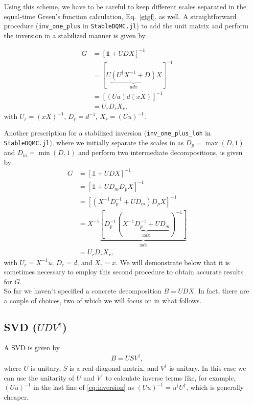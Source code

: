\documentclass[%
 reprint,
superscriptaddress,
citeautoscript,
showpacs,
 amsmath,amssymb,
 aps,
 prb,
longbibliography,
]{revtex4-1}
\begin{document}
Using this scheme, we have to be careful to keep different scales separated in the equal-time Green's function calculation, Eq.~\ref{etgf}, as well. A straightforward procedure (\texttt{inv\_one\_plus} in \texttt{StableDQMC.jl}) to add the unit matrix and perform the inversion in a stabilized manner is given by\cite{Santos2003, Assaad2002a}

\begin{align}
	G &= [\mathbb{1} + UDX]^{-1} \nonumber \\
	&= [U\underbrace{(U^\dagger X^{-1} + D)}_{udx}X]^{-1} \nonumber\\
	&= [(Uu)d(xX)]^{-1} \label{eq:inversion}\\
	&= U_r D_r X_r \nonumber,
\end{align}
with $U_r = (xX)^{-1}$, $D_r = d^{-1}$, $X_r = (Uu)^{-1}$.

Another prescription for a stabilized inversion (\texttt{inv\_one\_plus\_loh} in \texttt{StableDQMC.jl}), where we initially separate the scales in as $D_p = \max(D, 1)$ and $D_m = \min(D, 1)$ and perform two intermediate decompositions, is given by\cite{Loh2005, Loh1989}
\begin{align}
	G &= [\mathbb{1} + UDX]^{-1} \nonumber\\
	&= [\mathbb{1} + UD_mD_pX]^{-1} \nonumber\\
	&= [(X^{-1} D_p^{-1} + U D_m) D_p X]^{-1} \label{eq:inversion_loh} \\
	&= X^{-1} \underbrace{[D_p^{-1} (\underbrace{X^{-1} D_p^{-1} + UD_m}_{udx})^{-1}]}_{udx} \\
	&= U_r D_r X_r, \nonumber
\end{align}
with $U_r = X^{-1}u$, $D_r = d$, and $X_r = x$. We will demonstrate below that it is sometimes necessary to employ this second procedure to obtain accurate results for $G$.\\

So far we haven't specified a concrete decomposition $B = UDX$. In fact, there are a couple of choices, two of which we will focus on in what follows.

\subsection{SVD ($UDV^\dagger$)}
A SVD is given by
\begin{align}
	B = USV^\dagger,
\end{align}
where $U$ is unitary, $S$ is a real diagonal matrix, and $V^\dagger$ is unitary. In this case we can use the unitarity of $U$ and $V^\dagger$ to calculate inverse terms like, for example, $(Uu)^{-1}$ in the last line of \ref{eq:inversion} as $(Uu)^{-1} = u^\dagger U^\dagger$, which is generally cheaper.
\end{document}
